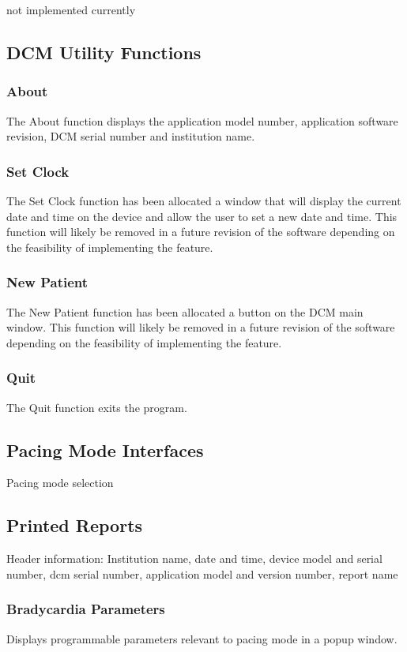 \documentclass[12pt]{article}
\begin{document}
not implemented currently

\subsection{DCM Utility Functions}
\subsubsection{About}
The About function displays the application model number, application software revision, DCM serial number and institution name.

\subsubsection{Set Clock}
The Set Clock function has been allocated a window that will display the current date and time on the device and allow the user to set a new date and time. This function will likely be removed in a future revision of the software depending on the feasibility of implementing the feature.

\subsubsection{New Patient}
The New Patient function has been allocated a button on the DCM main window. This function will likely be removed in a future revision of the software depending on the feasibility of implementing the feature.

\subsubsection{Quit}
The Quit function exits the program.

\subsection{Pacing Mode Interfaces}
Pacing mode selection

\subsection{Printed Reports}
Header information: Institution name, date and time, device model and serial number, dcm serial number, application model and version number, report name
\subsubsection{Bradycardia Parameters}
Displays programmable parameters relevant to pacing mode in a popup window.
\end{document}
